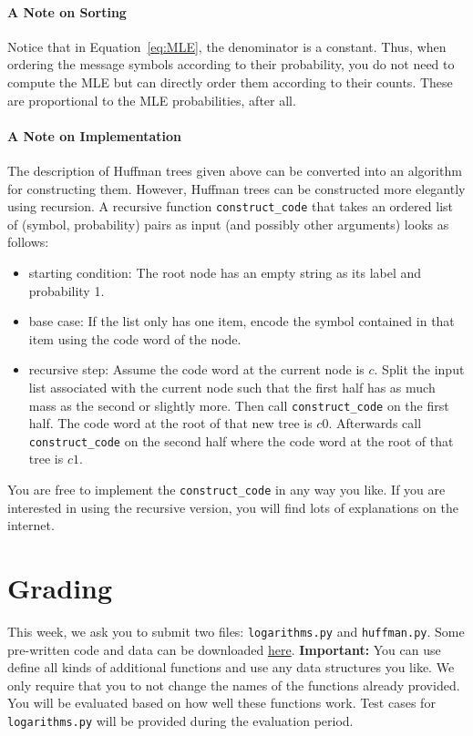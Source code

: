 \documentclass[11pt, leqno, a4paper]{article}
\begin{document}
\paragraph{A Note on Sorting} Notice that in Equation~\eqref{eq:MLE}, the denominator is a constant. Thus, when ordering the message symbols according to
their probability, you do not need to compute the MLE but can directly order them according to their counts. These are proportional to the MLE probabilities,
after all.

\paragraph{A Note on Implementation} The description of Huffman trees given above can be converted into an algorithm for constructing them. However, Huffman trees can
be constructed more elegantly using recursion. A recursive function \texttt{construct\_code} that takes an ordered list of (symbol, probability) pairs as input (and
possibly other arguments) looks as follows:
\begin{itemize}
\item starting condition: The root node has an empty string as its label and probability 1.
\item base case: If the list only has one item, encode the symbol contained in that item using the code word of the node.
\item recursive step: Assume the code word at the current node is $ c $. Split the input list associated with the current node
such that the first half has as much mass as the second or slightly more. Then call \texttt{construct\_code} on the first half. The code word
at the root of that new tree is $ c0 $. Afterwards call \texttt{construct\_code} on the second half where the code word at the root of that tree is $ c1 $.
\end{itemize} 

You are free to implement the \texttt{construct\_code} in any way you like. If you are interested in using the recursive version, you will find lots of
explanations on the internet.

\section{Grading}
This week, we ask you to submit two files: \texttt{logarithms.py} and \texttt{huffman.py}. Some pre-written code and data can be downloaded \href{https://github.com/BasicProbability/BasicProbability.github.io/raw/master/Homework/Programming/2016-17/Assignment3/assignment3_prerequisites.zip}{here}.
\textbf{Important:} You can use define all kinds of additional
functions and use any data structures you like. We only require that
you to not change the
names of the functions already provided. You will be evaluated based on how well these functions work. Test cases for \texttt{logarithms.py} will
be provided during the evaluation period.
\end{document}
